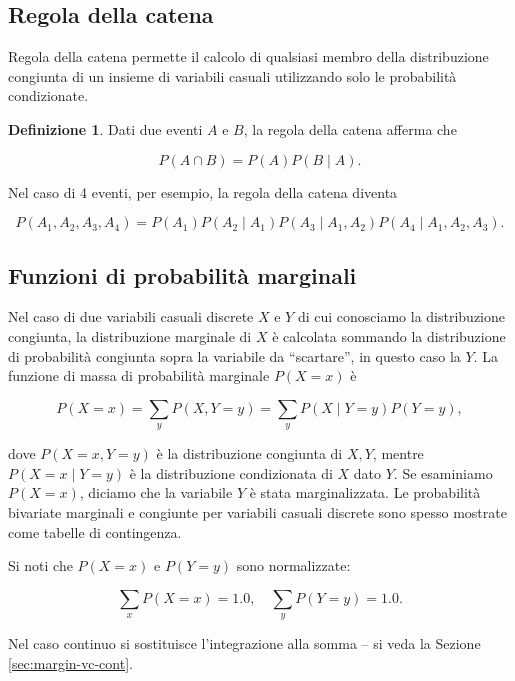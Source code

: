\documentclass[
  11pt,
]{krantz}
\theoremstyle{definition}
\newtheorem{definition}{Definizione}[chapter]
\theoremstyle{definition}
\theoremstyle{definition}
\theoremstyle{definition}
\theoremstyle{remark}
\begin{document}
\hypertarget{regola-della-catena}{%
\subsection{Regola della catena}\label{regola-della-catena}}

Regola della catena permette il calcolo di qualsiasi membro della distribuzione congiunta di un insieme di variabili casuali utilizzando solo le probabilità condizionate.

\begin{definition}
Dati due eventi \(A\) e \(B\), la regola della catena afferma che

\[
P(A \cap B) = P(A)P(B \mid A).
\]
\end{definition}

Nel caso di 4 eventi, per esempio, la regola della catena diventa

\[
P(A_1, A_2, A_3, A_4) = P(A_1) P(A_2 \mid A_1) P(A_3 \mid A_1, A_2) P(A_4 \mid A_1, A_2, A_3).
\]

\hypertarget{sec:marg-distr-discr}{%
\subsection{Funzioni di probabilità marginali}\label{sec:marg-distr-discr}}

Nel caso di due variabili casuali discrete \(X\) e \(Y\) di cui conosciamo la distribuzione congiunta, la distribuzione marginale di \(X\) è calcolata sommando la distribuzione di probabilità congiunta sopra la variabile da ``scartare'', in questo caso la \(Y\). La funzione di massa di probabilità marginale \(P(X=x)\) è

\begin{equation}
P(X = x) = \sum_y P(X, Y = y) = \sum_y P(X \mid Y = y) P(Y = y),
\end{equation}

dove \(P(X = x,Y = y)\) è la distribuzione congiunta di \(X, Y\), mentre \(P(X = x \mid Y = y)\) è la distribuzione condizionata di \(X\) dato \(Y\). Se esaminiamo \(P(X=x)\), diciamo che la variabile \(Y\) è stata marginalizzata. Le probabilità bivariate marginali e congiunte per variabili casuali discrete sono spesso mostrate come tabelle di contingenza.

Si noti che \(P(X = x)\) e \(P(Y = y)\) sono normalizzate:

\[
\sum_x P(X=x) = 1.0, \quad \sum_y P(Y=y) = 1.0.
\]

Nel caso continuo si sostituisce l'integrazione alla somma -- si veda la Sezione \ref{sec:margin-vc-cont}.
\end{document}
